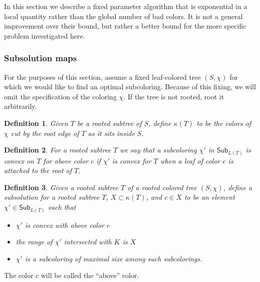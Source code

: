 \documentclass{amsart}
\newcommand{\col}{\chi}
\newcommand{\subcol}{\chi'}
\newcommand{\subcolS}{\mathsf{Sub}}
\newcommand{\subcolST}{\subcolS_{L(T)}}
\newcommand{\cut}{\kappa}
\newtheorem{defn}{Definition}
\begin{document}
In this section we describe a fixed parameter algorithm that is exponential in a local quantity rather than the global number of bad colors.
It is not a general improvement over their bound, but rather a better bound for the more specific problem investigated here.


\subsubsection{Subsolution maps}

For the purposes of this section, assume a fixed leaf-colored tree $(S, \col)$ for which we would like to find an optimal subcoloring.
Because of this fixing, we will omit the specification of the coloring $\col$.
If the tree is not rooted, root it arbitrarily.

\begin{defn}
  Given $T$ be a rooted subtree of $S$, define $\cut(T)$ to be the colors of $\col$ cut by the root edge of $T$ as it sits inside $S$.
\end{defn}


\begin{defn}
  For a rooted subtree $T$ we say that a subcoloring $\subcol$ in $\subcolST$ is convex on $T$ for above color $c$ if $\subcol$ is convex for $T$ when a leaf of color $c$ is attached to the root of $T$.
\end{defn}

\begin{defn}
  \label{defn:subsolution}
  Given a rooted subtree $T$ of a rooted colored tree $(S, \col)$, define a subsolution for a rooted subtree $T$, $X \subset \cut(T)$, and $c \in X$ to be an element $\subcol \in \subcolST$ such that
  \begin{itemize}
    \item $\subcol$ is convex with above color $c$
    \item the range of $\subcol$ intersected with $K$ is $X$
    \item $\subcol$ is a subcoloring of maximal size among such subcolorings.
  \end{itemize}
\end{defn}
The color $c$ will be called the ``above'' color.
\end{document}
